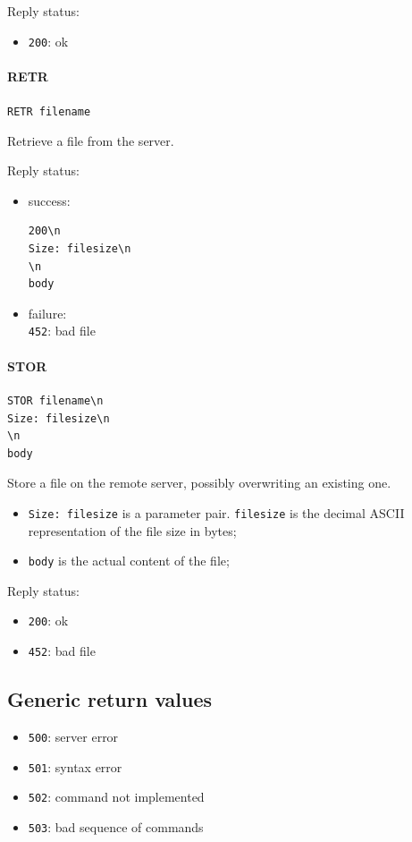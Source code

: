\documentclass[a4paper,12pt]{article}
\begin{document}
Reply status:
\begin{itemize}
  \item \texttt{200}: ok
\end{itemize}

\paragraph{RETR}
\texttt{RETR filename}

Retrieve a file from the server.

Reply status:
\begin{itemize}
  \item success:
\begin{verbatim}
200\n
Size: filesize\n
\n
body
\end{verbatim}
  \item failure:\\
  \texttt{452}: bad file
\end{itemize}

\paragraph{STOR}
\begin{verbatim}
STOR filename\n
Size: filesize\n
\n
body
\end{verbatim}

Store a file on the remote server, possibly overwriting an existing one.

\begin{itemize}
  \item \texttt{Size: filesize} is a parameter pair. \texttt{filesize} is the decimal ASCII representation of the file size in bytes;
  \item \texttt{body} is the actual content of the file;
\end{itemize}

Reply status:
\begin{itemize}
  \item \texttt{200}: ok
  \item \texttt{452}: bad file
\end{itemize}

\subsection{Generic return values}
\begin{itemize}
  \item \texttt{500}: server error
  \item \texttt{501}: syntax error
  \item \texttt{502}: command not implemented
  \item \texttt{503}: bad sequence of commands
\end{itemize}
\end{document}
